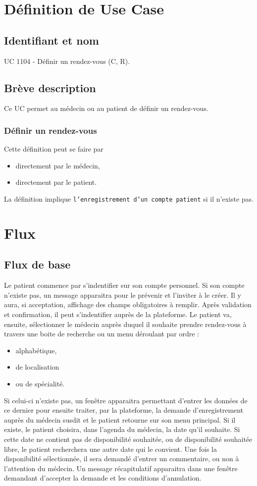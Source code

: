 \documentclass[a4paper, 11pt]{report}
\begin{document}
\section{Définition de Use Case}
\subsection{Identifiant et nom}
UC 1104 - Définir un rendez-vous (C, R).
\subsection{Brève description}
Ce UC permet au médecin ou au patient de définir un rendez-vous.
\subsubsection{Définir un rendez-vous}
Cette définition peut se faire par 
\begin{itemize}
	\item directement par le médecin,
	\item directement par le patient.
\end{itemize}

La définition implique \texttt{l'enregistrement d'un compte patient} si il n'existe pas.
\newpage

\section{Flux}
\subsection{Flux de base}
Le patient commence par s'indentifier sur son compte personnel. 
Si son compte n'existe pas, un message apparaitra pour le prévenir et l'inviter
à le créer. Il y aura, si acceptation, affichage des champs obligatoires à
remplir. Après validation et confirmation, il peut s'indentifier auprès de la plateforme.
Le patient va, ensuite, sélectionner le médecin auprès duquel il souhaite
prendre rendez-vous à travers une boite de recherche ou un menu déroulant par
ordre :
\begin{itemize}
	\item alphabétique,
	\item de localisation
	\item ou de spécialité.
\end{itemize}

Si celui-ci n'existe pas, un fenêtre apparaitra permettant d'entrer les données 
de ce dernier pour ensuite traiter, par la plateforme, la
demande d'enregistrement auprès du médecin susdit et le patient retourne sur
son menu principal.
Si il existe, le patient choisira, dans l'agenda du médecin, la date qu'il
souhaite. Si cette date ne contient pas de disponibilité souhaitée, ou de
disponibilité souhaitée libre, le patient recherchera une autre date qui le 
convient.
Une fois la disponibilité sélectionnée, il sera demandé d'entrer un commentaire,
ou non à l'attention du médecin. Un message récapitulatif apparaitra dans une
fenêtre demandant d'accepter la demande et les conditions d'annulation.
\end{document}
